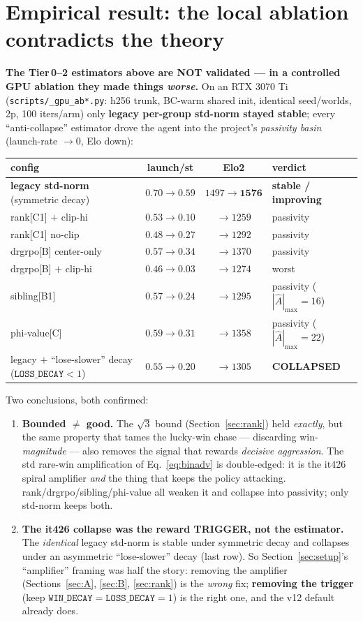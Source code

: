 \documentclass[11pt]{article}
\newcommand{\Adv}{\widehat{A}}
\newcommand{\cd}[1]{\texttt{#1}}
\begin{document}
\section{Empirical result: the local ablation contradicts the theory}\label{sec:empirical}
\textbf{The Tier\,0--2 estimators above are NOT validated --- in a controlled GPU ablation they made things
\emph{worse}.} On an RTX 3070 Ti (\cd{scripts/\_gpu\_ab*.py}: h256 trunk, BC-warm shared init, identical
seed/worlds, 2p, 100 iters/arm) only \textbf{legacy per-group std-norm stayed stable}; every ``anti-collapse''
estimator drove the agent into the project's \emph{passivity basin} (launch-rate $\to 0$, Elo down):
\begin{center}\small
\begin{tabular}{@{}lccl@{}}
\toprule
config & launch/st & Elo2 & verdict \\
\midrule
\textbf{legacy std-norm} (symmetric decay) & $0.70\!\to\!0.59$ & $1497\!\to\!\mathbf{1576}$ & \textbf{stable / improving} \\
rank[C1] $+$ clip-hi & $0.53\!\to\!0.10$ & $\to 1259$ & passivity \\
rank[C1] no-clip & $0.48\!\to\!0.27$ & $\to 1292$ & passivity \\
drgrpo[B] center-only & $0.57\!\to\!0.34$ & $\to 1370$ & passivity \\
drgrpo[B] $+$ clip-hi & $0.46\!\to\!0.03$ & $\to 1274$ & worst \\
sibling[B1] & $0.57\!\to\!0.24$ & $\to 1295$ & passivity ($|\Adv|_{\max}\!=\!16$) \\
phi-value[C] & $0.59\!\to\!0.31$ & $\to 1358$ & passivity ($|\Adv|_{\max}\!=\!22$) \\
\midrule
legacy $+$ ``lose-slower'' decay ($\cd{LOSS\_DECAY}<1$) & $0.55\!\to\!0.20$ & $\to 1305$ & \textbf{COLLAPSED} \\
\bottomrule
\end{tabular}
\end{center}
Two conclusions, both confirmed:
\begin{enumerate}[nosep,leftmargin=1.5em]
\item \textbf{Bounded $\ne$ good.} The $\sqrt3$ bound (Section~\ref{sec:rank}) held \emph{exactly}, but the same
property that tames the lucky-win chase --- discarding win-\emph{magnitude} --- also removes the signal that
rewards \emph{decisive aggression}. The std rare-win amplification of Eq.~\eqref{eq:binadv} is double-edged: it
is the it426 spiral amplifier \emph{and} the thing that keeps the policy attacking. rank/drgrpo/sibling/phi-value
all weaken it and collapse into passivity; only std-norm keeps both.
\item \textbf{The it426 collapse was the reward TRIGGER, not the estimator.} The \emph{identical} legacy std-norm
is stable under symmetric decay and collapses under an asymmetric ``lose-slower'' decay (last row). So
Section~\ref{sec:setup}'s ``amplifier'' framing was half the story: removing the amplifier (Sections~\ref{sec:A},
\ref{sec:B}, \ref{sec:rank}) is the \emph{wrong} fix; \textbf{removing the trigger} (keep
$\cd{WIN\_DECAY}=\cd{LOSS\_DECAY}=1$) is the right one, and the v12 default already does.
\end{enumerate}
\end{document}
